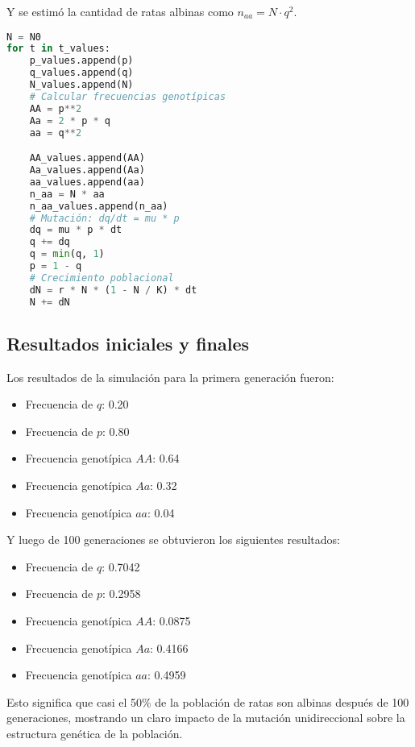 \documentclass[12pt]{article}
\begin{document}
Y se estimó la cantidad de ratas albinas como \(n_{aa} = N \cdot q^2\).
\begin{lstlisting}[language=Python, caption={Simulación de evolución genética con mutación unidireccional: Calculos de frecuencias, mutaciónes y crecimiento poblacional}]
N = N0
for t in t_values:
    p_values.append(p)
    q_values.append(q)
    N_values.append(N)
    # Calcular frecuencias genotípicas
    AA = p**2
    Aa = 2 * p * q
    aa = q**2

    AA_values.append(AA)
    Aa_values.append(Aa)
    aa_values.append(aa)
    n_aa = N * aa
    n_aa_values.append(n_aa)
    # Mutación: dq/dt = mu * p
    dq = mu * p * dt
    q += dq
    q = min(q, 1)
    p = 1 - q
    # Crecimiento poblacional
    dN = r * N * (1 - N / K) * dt
    N += dN
\end{lstlisting}


\subsection*{Resultados iniciales y finales}

Los resultados de la simulación para la primera generación fueron:

\begin{itemize}
    \item Frecuencia de $q$: 0.20
    \item Frecuencia de $p$: 0.80
    \item Frecuencia genotípica $AA$: 0.64
    \item Frecuencia genotípica $Aa$: 0.32
    \item Frecuencia genotípica $aa$: 0.04
\end{itemize}

Y luego de 100 generaciones se obtuvieron los siguientes resultados:

\begin{itemize}
    \item Frecuencia de $q$: 0.7042
    \item Frecuencia de $p$: 0.2958
    \item Frecuencia genotípica $AA$: 0.0875
    \item Frecuencia genotípica $Aa$: 0.4166
    \item Frecuencia genotípica $aa$: 0.4959
\end{itemize}

Esto significa que casi el 50\% de la población de ratas son albinas después de 100 generaciones, mostrando un claro impacto de la mutación unidireccional sobre la estructura genética de la población.
\end{document}
